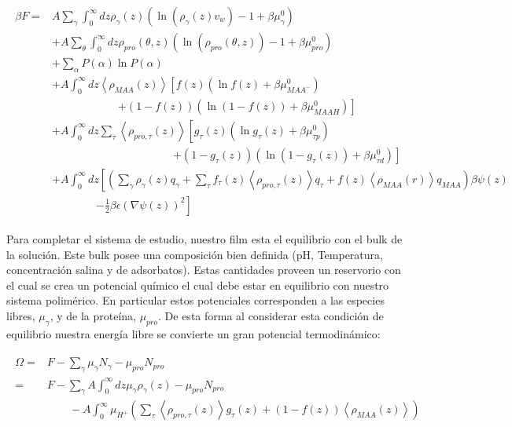 \begin{align}
	\begin{aligned}
		\beta F=  & A\sum_{\gamma}\int_0^\infty{dz\rho_\gamma(z)\left(\ln \left(\rho_\gamma (z)v_w\right) -1 + \beta\mu^0_\gamma\right)} \\
		&+ A\sum_{\theta}\int_0^\infty{dz\rho_{pro}(\theta,z)\left(\ln \left(\rho_{pro}(\theta,z)\right) -1 + \beta\mu^0_{pro} \right)} \\
		&+ \sum_\alpha{P(\alpha)\ln P(\alpha)} \\
		& + A\int_0^\infty dz \left<\rho_{MAA}(z)\right> \left[f(z)(\ln f(z)+ \beta\mu^0_{MAA^-})\right.\\
		& \qquad\qquad\qquad \left.+(1-f(z))(\ln (1-f(z))+\beta\mu^0_{MAAH})\right] \\
		& + A\int_0^\infty dz \sum_\tau \left<\rho_{pro,\tau}(z)\right> \left[g_\tau(z)(\ln g_\tau(z)+ \beta\mu^0_{\tau p})\right.\\
		&\qquad \qquad \qquad\qquad \qquad\quad \left.+(1-g_\tau(z))(\ln (1-g_\tau(z))+\beta\mu^0_{\tau d})\right]   \\
		 & +A\int_0^\infty dz \left[\left(\sum_{\gamma } {\rho_\gamma(z) q_\gamma + \sum_\tau{f_\tau(z) \left<\rho_{pro,\tau}(z)\right> q_\tau} +  f(z)\left<\rho_{MAA}(r)\right>q_{MAA}}\right)\beta\psi(z) \right. \\ & \qquad \qquad \left.-\frac{1}{2}\beta\epsilon(\nabla\psi(z))^2 \right]
		\end{aligned}
\end{align}


Para completar el sistema de estudio, nuestro film esta el equilibrio con el bulk de la soluci\'on. Este bulk  posee una composici\'on bien definida (pH, Temperatura, concentraci\'on salina y de adsorbatos). Estas cantidades proveen un reservorio con el cual se crea un potencial qu\'imico el cual debe estar en equilibrio con nuestro sistema polim\'erico. En particular estos potenciales corresponden a las especies libres, $\mu_\gamma$, y de la prote\'ina, $\mu_{pro}$.
De esta forma al considerar esta condici\'on de equilibrio nuestra energ\'ia libre se convierte un gran potencial termodin\'amico:

\begin{align}
	\begin{aligned}
		\Omega = &F - \sum_\gamma \mu_\gamma N_\gamma -  \mu_{pro} N_{pro} \\
			= &F -\sum_\gamma A\int_0^\infty dz \mu_\gamma \rho_\gamma(z) -  \mu_{pro} N_{pro}  \\
			& \qquad -A\int_0^\infty \mu_{H^+} \left( \sum_\tau\left< \rho_{pro,\tau}(z) \right>g_\tau(z) + (1-f(z))\left< \rho_{MAA}(z) \right> \right )
			\end{aligned}
		\label{eq:film:equil-qco}
\end{align}

